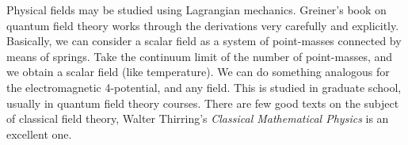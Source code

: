 Physical fields may be studied using Lagrangian mechanics. Greiner's
book on quantum field theory works through the derivations very
carefully and explicitly. Basically, we can consider a scalar field as a
system of point-masses connected by means of springs. Take the continuum
limit of the number of point-masses, and we obtain a scalar field (like
temperature). We can do something analogous for the electromagnetic
4-potential, and any field. This is studied in graduate school, usually
in quantum field theory courses. There are few good texts on the subject
of classical field theory, Walter Thirring's \emph{Classical Mathematical Physics}
is an excellent one.